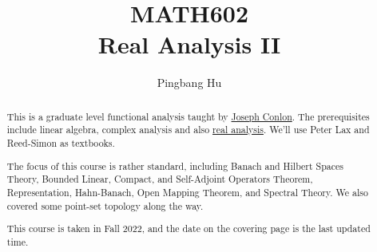 \documentclass[a4paper]{report}
\author{Pingbang Hu}
\title{MATH602\\Real Analysis II}
\begin{document}
\maketitle

\begin{abstract}
	This is a graduate level functional analysis taught by \href{https://lsa.umich.edu/math/people/faculty/conlon.html}{Joseph Conlon}. The prerequisites include linear algebra, complex analysis and also \href{https://www.pbb.wtf/posts/Notes#real-analysis-math597-umich}{real analysis}. We'll use Peter Lax\cite{lax2002functional} and Reed-Simon\cite{reed1980functional} as textbooks.

	The focus of this course is rather standard, including Banach and Hilbert Spaces Theory, Bounded Linear, Compact, and Self-Adjoint Operators Theorem, Representation, Hahn-Banach, Open Mapping Theorem, and Spectral Theory. We also covered some point-set topology along the way.

	\vfill
	This course is taken in Fall 2022, and the date on the covering page is the last updated time.
\end{abstract}

\tableofcontents


\newpage
\appendix
\appendixpage



\newpage
\printbibliography
\end{document}

